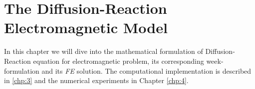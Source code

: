\documentclass[../Dissertation]{subfiles}
\begin{document}
\section{The Diffusion-Reaction Electromagnetic Model}\label{sec:DREM model}

In this chapter we will dive into the mathematical formulation of Diffusion-Reaction equation for electromagnetic problem, its corresponding week-formulation and its \emph{FE} solution. The computational implementation is described in \autoref{chp:3} and the numerical experiments in Chapter \autoref{chp:4}.


\end{document}

